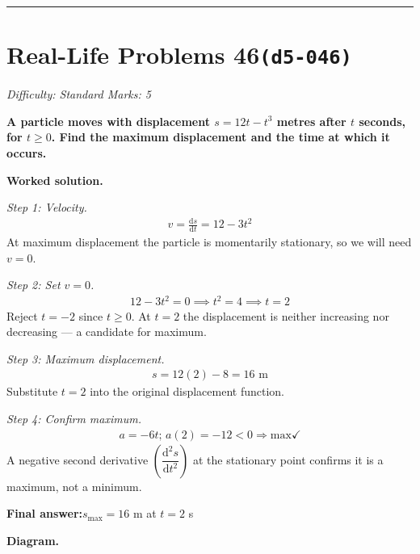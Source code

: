\documentclass[11pt]{article}
\newcommand{\question}[1]{\par\medskip\noindent\textbf{#1}\par}
\begin{document}
\medskip\hrule

\section*{Real-Life Problems 46\quad\small\texttt{(d5-046)}}
\textit{Difficulty: Standard \quad\textbar\quad Marks: 5}

\question{A particle moves with displacement \( s = 12t - t^3 \) metres after \( t \) seconds, for \( t \ge 0 \). Find the maximum displacement and the time at which it occurs.}

\textbf{Worked solution.}

\textit{Step 1: Velocity.}
\[\begin{gathered}
v = \frac{\mathrm{d}s}{\mathrm{d}t} = 12 - 3t^2
\end{gathered}\]
At maximum displacement the particle is momentarily stationary, so we will need \( v = 0 \).

\textit{Step 2: Set \( v = 0 \).}
\[\begin{gathered}
12 - 3t^2 = 0 \implies t^2 = 4 \implies t = 2
\end{gathered}\]
Reject \( t = -2 \) since \( t \ge 0 \). At \( t = 2 \) the displacement is neither increasing nor decreasing --- a candidate for maximum.

\textit{Step 3: Maximum displacement.}
\[\begin{gathered}
s = 12(2) - 8 = 16 \text{ m}
\end{gathered}\]
Substitute \( t = 2 \) into the original displacement function.

\textit{Step 4: Confirm maximum.}
\[\begin{gathered}
a = -6t; \, a(2) = -12 < 0 \Rightarrow \text{max} \checkmark
\end{gathered}\]
A negative second derivative \( \left(\dfrac{\mathrm{d}^2 s}{\mathrm{d}t^2}\right) \) at the stationary point confirms it is a maximum, not a minimum.

\begin{answerbox}
\textbf{Final answer:}\quad \(\displaystyle  s_{\max} = 16 \) m at \(\displaystyle  t = 2 \) s
\end{answerbox}
\textbf{Diagram.}
\end{document}
